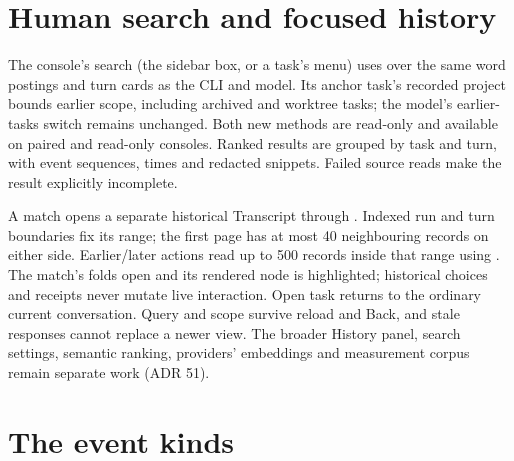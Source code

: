 \section{Human search and focused history}

The console's search (the sidebar box, or a task's menu) uses  over the
same word postings and turn cards as the CLI and model. Its anchor task's
recorded project bounds earlier scope, including archived and worktree tasks;
the model's earlier-tasks switch remains unchanged. Both new methods are
read-only and available on paired and read-only consoles. Ranked results
are grouped by task and turn, with event sequences, times and redacted
snippets. Failed source reads make the result explicitly incomplete.

A match opens a separate historical Transcript through .
Indexed run and turn boundaries fix its range; the first page has at most
40 neighbouring records on either side. Earlier/later actions read up to
500 records inside that range using . The match's folds
open and its rendered node is highlighted; historical choices and receipts
never mutate live interaction. Open task returns to the ordinary current
conversation. Query and scope survive reload and Back, and stale responses
cannot replace a newer view. The broader History panel, search settings,
semantic ranking, providers' embeddings and measurement corpus remain
separate work (ADR 51).

\section{The event kinds}

